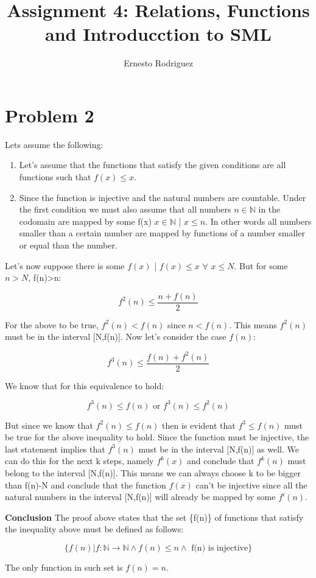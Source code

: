 \documentclass{article}
\title{Assignment 4: Relations, Functions and Introducction to SML}
\author{Ernesto Rodriguez}
\begin{document}
\maketitle

\section{Problem 2}

Lets assume the following:

\begin{enumerate}
  \item{Let's assume that the functions that satisfy the given conditions are all functions such that $f(x) \leq x$.}
  \item{Since the function is injective and the natural numbers are countable. Under the first condition we must also assume that all numbers $n \in \mathbb{N}$ in the codomain are mapped by some f(x) $x \in \mathbb{N}$ | $x \leq n$. In other words all numbers smaller than a certain number are mapped by functions of a number smaller or equal than the number.}
\end{enumerate}

Let's now suppose there is some $f(x)$ | $f(x) \leq x$ $\forall$ $x \leq N$. But for some $n > N$, f(n)>n:

\[
f^2(n) \leq \frac{n+f(n)}{2}
\]

For the above to be true, $f^2(n) < f(n)$ since $n<f(n)$. This means $f^2(n)$ must be in the interval [N,f(n)]. Now let's consider the case $f(n)$:

\[
f^3(n) \leq \frac{f(n)+f^2(n)}{2}
\]

We know that for this equivalence to hold:

\[
f^3(n) \leq f(n) \text{ or } f^3(n) \leq f^2(n)
\]

But since we know that $f^2(n) \leq f(n)$ then is evident that $f^3 \leq f(n)$ must be true for the above inequality to hold. Since the function must be injective, the last statement implies that $f^3(n)$ must be in the interval [N,f(n)] as well. We can do this for the next k steps, namely $f^k(x)$ and conclude that $f^k(n)$ must belong to the interval [N,f(n)]. This means we can always choose k to be bigger than f(n)-N and conclude that the function $f(x)$ can't be injective since all the natural numbers in the interval [N,f(n)] will already be mapped by some $f^i(n)$. 

{\bf Conclusion } The proof above states that the set \{f(n)\} of functions that satisfy the inequality above must be defined as follows:

\[
\{f(n)|f:\mathbb{N} \rightarrow \mathbb{N} \wedge f(n)\leq n \wedge \text{ f(n) is injective}\}
\]

The only function in such set is $f(n)=n$.
\end{document}
